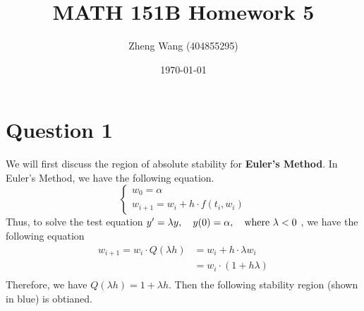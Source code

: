 \documentclass[11pt]{article}
\author{Zheng Wang (404855295)}
\date{\today}
\title{MATH 151B Homework 5}
\begin{document}

\maketitle
\section*{Question 1}
We will first discuss the region of absolute stability for \textbf{Euler's Method}. In Euler's Method, we have the following equation.
\[ \begin{cases}
w_0 = \alpha\\
w_{i+1} = w_i + h\cdot f(t_i, w_i)
\end{cases} \]
Thus, to solve the test equation $ y' = \lambda y, \quad y(0) = \alpha, \quad \text{where $ \lambda < 0 $ } $, we have the following equation\\
\begin{align*}
	w_{i+1} = w_i \cdot Q(\lambda h) &= w_i + h\cdot \lambda w_i\\
	&= w_i\cdot (1 + h\lambda)\\
\end{align*}
Therefore, we have $ Q(\lambda h) = 1+ \lambda h $. Then the following stability region (shown in blue) is obtianed.
\end{document}
